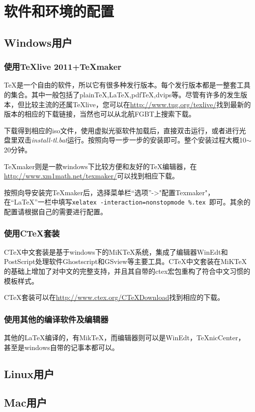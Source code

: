 \chapter{软件和环境的配置}
	\section{Windows用户}
		\subsection{使用\TeX{}live 2011+\TeX{}maker}
		\TeX{}是一个自由的软件，所以它有很多种发行版本。每个发行版本都是一整套工具的集合。其中一般包括了plainTeX,LaTeX,pdfTeX,dvips等。尽管有许多的发生版本，但比较主流的还属\TeX{}live，您可以在\url{http://www.tug.org/texlive/}找到最新的版本的相应的下载链接，当然也可以从北航FGBT上搜索下载。\par
		下载得到相应的iso文件，使用虚拟光驱软件加载后，直接双击运行，或者进行光盘里双击\textsl{install-tl.bat}运行。按照向导一步一步的安装即可。整个安装过程大概10$\sim$20分钟。\par
		\TeX{}maker则是一款windows下比较方便和友好的\TeX{}编辑器，在\url{http://www.xm1math.net/texmaker/}可以找到相应下载。\par
		按照向导安装完\TeX{}maker后，选择菜单栏“选项”->"配置Texmaker"，在“LaTeX”一栏中填写\texttt{xelatex -interaction=nonstopmode \%.tex}~即可。其余的配置请根据自己的需要进行配置。\par
		\subsection{使用C\TeX{}套装}
		C\TeX{}中文套装是基于windows下的MiKTeX系统，集成了编辑器WinEdt和PostScript处理软件Ghostscript和GSview等主要工具。C\TeX{}中文套装在MiKTeX的基础上增加了对中文的完整支持，并且其自带的ctex宏包重构了符合中文习惯的模板样式。\par
		C\TeX{}套装可以在\url{http://www.ctex.org/CTeXDownload}找到相应的下载。
		\subsection{使用其他的编译软件及编辑器}
		其他的\LaTeX{}编译的，有MikTeX，而编辑器则可以是WinEdt，TeXnicCenter，甚至是windows自带的记事本都可以。
	\section{Linux用户}
	\section{Mac用户}
